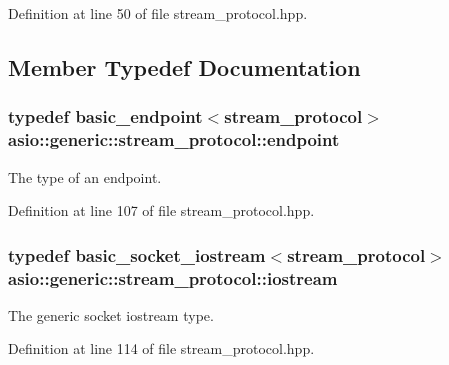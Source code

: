 Definition at line 50 of file stream\+\_\+protocol.\+hpp.



\subsection{Member Typedef Documentation}
\hypertarget{classasio_1_1generic_1_1stream__protocol_a2217db3a8791fa9c28a340b877d2ef0f}{}
\subsubsection[{endpoint}]{\setlength{\rightskip}{0pt plus 5cm}typedef {\bf basic\+\_\+endpoint}$<${\bf stream\+\_\+protocol}$>$ {\bf asio\+::generic\+::stream\+\_\+protocol\+::endpoint}}\label{classasio_1_1generic_1_1stream__protocol_a2217db3a8791fa9c28a340b877d2ef0f}


The type of an endpoint. 



Definition at line 107 of file stream\+\_\+protocol.\+hpp.

\hypertarget{classasio_1_1generic_1_1stream__protocol_a8c47df8acd5a63bd939cef41beaf202d}{}
\subsubsection[{iostream}]{\setlength{\rightskip}{0pt plus 5cm}typedef {\bf basic\+\_\+socket\+\_\+iostream}$<${\bf stream\+\_\+protocol}$>$ {\bf asio\+::generic\+::stream\+\_\+protocol\+::iostream}}\label{classasio_1_1generic_1_1stream__protocol_a8c47df8acd5a63bd939cef41beaf202d}


The generic socket iostream type. 



Definition at line 114 of file stream\+\_\+protocol.\+hpp.

\hypertarget{classasio_1_1generic_1_1stream__protocol_abff2e68a3458693a14e871b1f94a850c}{}
